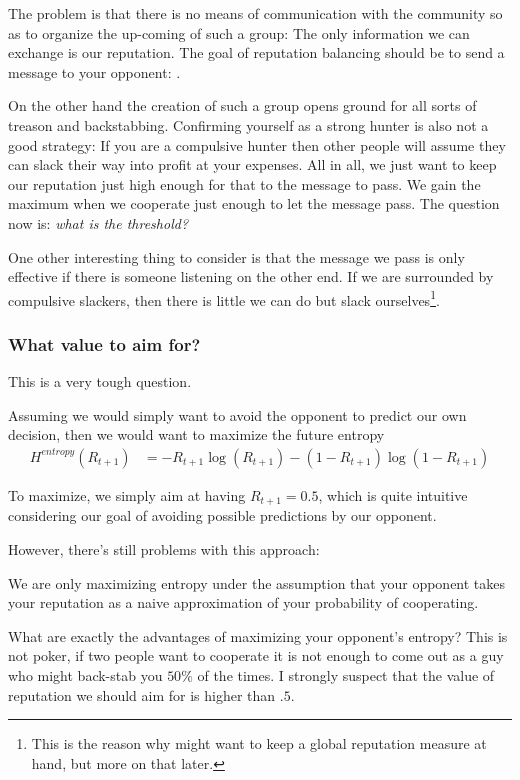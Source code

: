 \documentclass[10pt,fleqn]{article}
\begin{document}
The problem is that there is no means of communication with the community so as
to organize the up-coming of such a group: The only information we can exchange
is our reputation. The goal of reputation balancing should be to send a message
to your opponent: .

On the other hand the creation of such a group opens ground for all sorts of
treason and backstabbing. Confirming yourself as a strong hunter is also not a
good strategy: If you are a compulsive hunter then other people will assume they
can slack their way into profit at your expenses. All in all, we just want to
keep our reputation just high enough for that to the message to pass. We gain
the maximum when we cooperate just enough to let the message pass. The question
now is: \emph{what is the threshold?}

One other interesting thing to consider is that the message we pass is only
effective if there is someone listening on the other end. If we are surrounded
by compulsive slackers, then there is little we can do but slack
ourselves\footnote{This is the reason why might want to keep a global reputation
measure at hand, but more on that later.}.

\subsubsection{What value to aim for?}

This is a very tough question.

Assuming we would simply want to avoid the opponent to predict our own
decision, then we would want to maximize the future entropy
\begin{align*}
  H^{entropy}(R_{t+1}) &= - R_{t+1} \log(R_{t+1}) - (1-R_{t+1}) \log(1-R_{t+1})
\end{align*}

To maximize, we simply aim at having $R_{t+1} = 0.5$, which is quite intuitive
considering our goal of avoiding possible predictions by our opponent.

However, there's still problems with this approach:
\begin{inlist}
  \item We are only maximizing entropy under the assumption that your opponent
  takes your reputation as a naive approximation of your probability of
  cooperating.
  \item What are exactly the advantages of maximizing your opponent's entropy?
  This is not poker, if two people want to cooperate it is not enough to come
  out as a guy who might back-stab you $50\%$ of the times. I strongly suspect
  that the value of reputation we should aim for is higher than $.5$.
\end{inlist}
\end{document}
